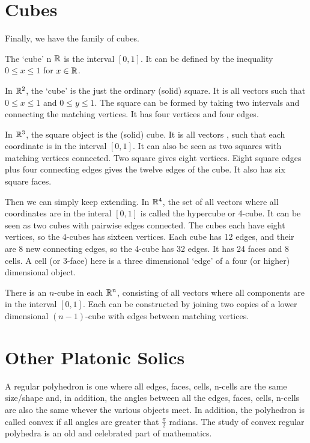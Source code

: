 \documentclass[fleqn]{report}
\begin{document}
\section{Cubes}

Finally, we have the family of cubes.
\begin{smallitemize}
\item The `cube' n $\mathbb{R}$ is the interval $[0,1]$. It
can be defined by the inequality $0 \leq x \leq 1$ for $x \in
\mathbb{R}$. 
\item In $\mathbb{R}^2$, the `cube' is the just the ordinary
(solid) square. It is all vectors
 such that $0 \leq x \leq 1$
and $0 \leq y \leq 1$. The square can be formed by taking two
intervals and connecting the matching vertices. It has four
vertices and four edges.
\item In $\mathbb{R}^3$, the square object is the (solid) cube. It is
all vectors , such that
each coordinate is in the interval $[0,1]$. It can also be
seen as two squares with matching vertices connected. Two
square gives eight vertices. Eight square edges plus four
connecting edges gives the twelve edges of the cube. It also
has six square faces. 
\item Then we can simply keep extending. In $\mathbb{R}^4$, the set of all
vectors  where all
coordinates are in the interal $[0,1]$ is called the hypercube
or 4-cube. It can be seen as two cubes with pairwise edges
connected. The cubes each have eight vertices, so the 4-cubes
has sixteen vertices. Each cube has 12 edges, and their are 8
new connecting edges, so the 4-cube has 32 edges. It has 24
faces and 8 cells. A cell (or 3-face) here is a three
dimensional `edge' of a four (or higher) dimensional object. 
\item There is an $n$-cube in each $\mathbb{R}^n$, consisting of all
vectors where all components are in the interval $[0,1]$. Each
can be constructed by joining two copies of a lower
dimensional $(n-1)$-cube with edges between matching vertices.
\end{smallitemize}

\section{Other Platonic Solics}

A regular polyhedron is one where all edges, faces, cells,
n-cells are the same size/shape and, in addition, the angles
between all the edges, faces, cells, n-cells are also the same
whever the various objects meet. In addition, the polyhedron
is called convex if all angles are greater that
$\frac{\pi}{2}$ radians. The study of convex regular polyhedra
is an old and celebrated part of mathematics. 
\end{document}
